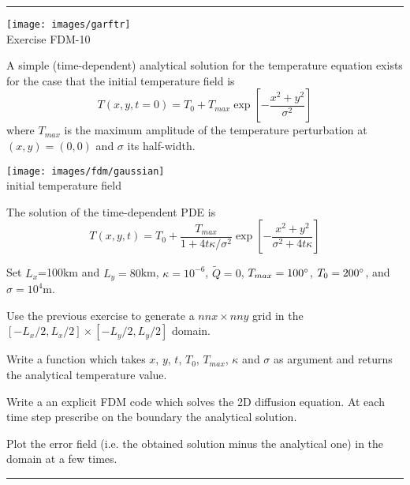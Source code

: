 \begin{center}
\begin{minipage}[t]{0.77\textwidth}
\par\noindent\rule{\textwidth}{0.4pt}
\begin{center}
\texttt{[image: images/garftr]} \\
{\color{orange}Exercise FDM-10}
\end{center}

A simple (time-dependent) analytical solution for the temperature equation exists for 
the case that the initial temperature field is
\begin{equation}
T(x,y,t=0) = T_0+ T_{max} \exp \left[ -\frac{x^2+y^2}{\sigma^2}   \right]
\end{equation}
where $T_{max}$ is the maximum amplitude of the temperature perturbation 
at $(x,y) = (0, 0)$ and $\sigma$ its half-width. 

\begin{center}
\texttt{[image: images/fdm/gaussian]}\\
{\captionfont initial temperature field}
\end{center}

The solution of the time-dependent PDE is
\begin{equation}
T(x,y,t)=T_0 + \frac{T_{max}}{1+4t\kappa/\sigma^2 } \exp \left[ -\frac{x^2+y^2}{\sigma^2 + 4t\kappa}   \right]
\end{equation}

Set $L_x$=100km and $L_y=80$km, $\kappa=10^{-6}$, $\tilde{Q}=0$, $T_{max}=100\degree$, $T_0=200\degree$, 
and $\sigma=10^4$m. 

Use the previous exercise to generate a $nnx\times nny$ grid 
in the $[-L_x/2,L_x/2]\times[-L_y/2,L_y/2]$ domain.

Write a function which takes $x$, $y$, $t$, $T_0$, $T_{max}$, $\kappa$ and $\sigma$ as argument 
and returns the analytical temperature value.

Write a an explicit FDM code which solves the 2D diffusion equation. At each time step 
prescribe on the boundary the analytical solution.  

Plot the error field
(i.e. the obtained solution minus the analytical one)
in the domain at a few times.

\par\noindent\rule{\textwidth}{0.4pt}
\end{minipage}
\end{center}



